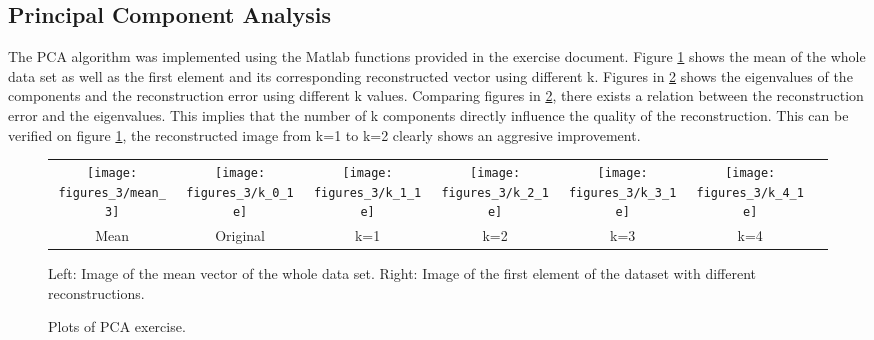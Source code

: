 \subsection{Principal Component Analysis}
The PCA algorithm was implemented using the Matlab functions provided in the exercise document. Figure \ref{3_333} shows the mean of the whole data set as well as the first element and its corresponding reconstructed vector using different k. Figures in \ref{eigenvqlues_plot} shows the eigenvalues of the components and the reconstruction error using different k values.
\bigbreak
Comparing figures in \ref{eigenvqlues_plot}, there exists a relation between the reconstruction error and the eigenvalues. This implies that the number of k components directly influence the quality of the reconstruction. This can be verified on figure  \ref{3_333}, the reconstructed image from k=1 to k=2 clearly shows an aggresive improvement.

\begin{figure}[!htbp]
\caption{Left: Image of the mean vector of the whole data set. Right: Image of the first element of the dataset with different reconstructions.}
\label{3_333}
\medbreak
\begin{tabular}{ccccccc}
\texttt{[image: figures\_3/mean\_3]} &
\texttt{[image: figures\_3/k\_0\_1e]} &
\texttt{[image: figures\_3/k\_1\_1e]} &
\texttt{[image: figures\_3/k\_2\_1e]} &
\texttt{[image: figures\_3/k\_3\_1e]} &
\texttt{[image: figures\_3/k\_4\_1e]}\\
 Mean & Original & k=1 & k=2 & k=3 & k=4\\
\end{tabular}
\centering
\end{figure}


\begin{figure}[!htbp]
\caption{Plots of PCA exercise.}
\label{eigenvqlues_plot}
  \centering
  \label{eigenvqlues_plot}
  \hfill
\end{figure}


